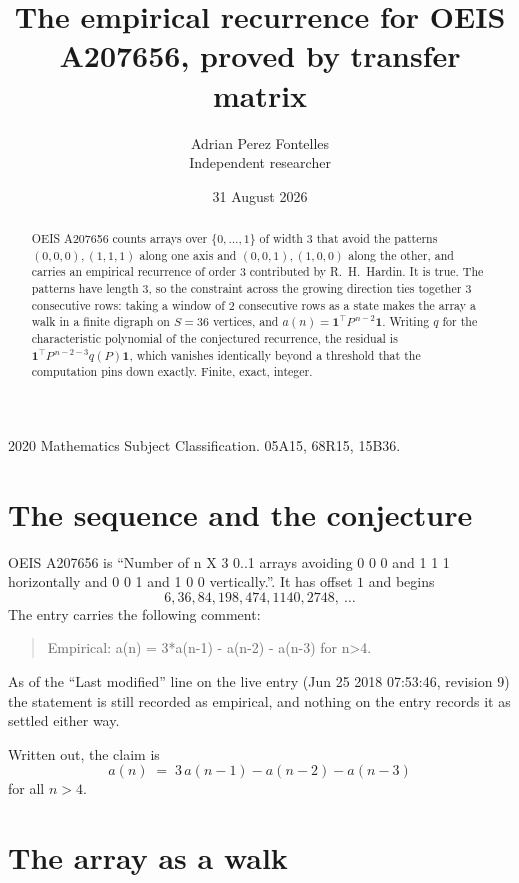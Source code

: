 \documentclass[11pt,a4paper]{article}
\title{The empirical recurrence for OEIS A207656, proved by transfer matrix}
\author{Adrian Perez Fontelles\\ \small Independent researcher}
\date{31 August 2026}
\theoremstyle{plain}
\theoremstyle{definition}
\begin{document}
\maketitle

\begin{abstract}
OEIS A207656 counts arrays over $\{0,\dots,1\}$ of width $3$ that avoid the patterns
$(0,0,0), (1,1,1)$ along one axis and $(0,0,1), (1,0,0)$ along the other, and carries an empirical recurrence of
order $3$ contributed by R.~H.~Hardin. It is true. The patterns have length $3$, so
the constraint across the growing direction ties together $3$ consecutive rows: taking a
window of $2$ consecutive rows as a state makes the array a walk in a finite digraph
on $S=36$ vertices, and $a(n)=\mathbf{1}^{\!\top}P^{\,n-2}\mathbf{1}$. Writing $q$
for the characteristic polynomial of the conjectured recurrence, the residual is
$\mathbf{1}^{\!\top}P^{\,n-2-3}q(P)\mathbf{1}$, which vanishes identically
beyond a threshold that the computation pins down exactly. Finite, exact, integer.
\end{abstract}

\noindent\small 2020 Mathematics Subject Classification. 05A15, 68R15, 15B36.\normalsize

\section{The sequence and the conjecture}

OEIS A207656 is ``Number of n X 3 0..1 arrays avoiding 0 0 0 and 1 1 1 horizontally and 0 0 1 and 1 0 0 vertically.''. It has offset
$1$ and begins
\[
6, 36, 84, 198, 474, 1140, 2748,\ \dots
\]
The entry carries the following comment:
\begin{quote}\small
Empirical: a(n) = 3*a(n-1) - a(n-2) - a(n-3) for n>4.
\end{quote}
As of the ``Last modified'' line on the live entry (Jun 25 2018 07:53:46, revision
9) the statement is still recorded as empirical, and nothing on the entry
records it as settled either way.

Written out, the claim is
\begin{equation}\label{eq:conj}
a(n)\;=\;3\,a(n-1) - a(n-2) - a(n-3)
\end{equation}
for all $n>4$. 

\section{The array as a walk}
\end{document}
